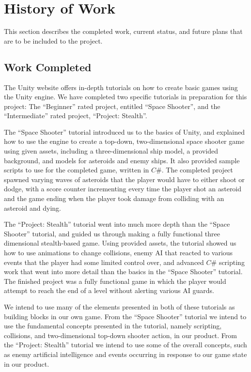 \documentclass[12pt]{article}       %
\def\hs{\hspace{15pt}}
\begin{document}
\section{History of Work}
\label{sec:history}
This section describes the completed work, current status, and future plans that are to be included to the project.

\subsection{Work Completed}

\hs The Unity website offers in-depth tutorials on how to create basic games using the Unity engine. We have completed two specific tutorials in preparation for this project: The “Beginner” rated project, entitled “Space Shooter”, and the “Intermediate” rated project, “Project: Stealth”.

  The “Space Shooter” tutorial introduced us to the basics of Unity, and explained how to use the engine to create a top-down, two-dimensional space shooter game using given assets, including a three-dimensional ship model, a provided background, and models for asteroids and enemy ships. It also provided sample scripts to use for the completed game, written in $C\#$. The completed project spawned varying waves of asteroids that the player would have to either shoot or dodge, with a score counter incrementing every time the player shot an asteroid and the game ending when the player took damage from colliding with an asteroid and dying.

 The “Project: Stealth” tutorial went into much more depth than the “Space Shooter” tutorial, and guided us through making a fully functional three dimensional stealth-based game. Using provided assets, the tutorial showed us how to use animations to change collisions, enemy AI that reacted to various events that the player had some limited control over, and advanced $C\#$ scripting work that went into more detail than the basics in the “Space Shooter” tutorial. The finished project was a fully functional game in which the player would attempt to reach the end of a level without alerting various AI guards.

  We intend to use many of the elements presented in both of these tutorials as building blocks in our own game. From the “Space Shooter” tutorial we intend to use the fundamental concepts presented in the tutorial, namely scripting, collisions, and two-dimensional top-down shooter action, in our product. From the “Project: Stealth” tutorial we intend to use some of the overall concepts, such as enemy artificial intelligence and events occurring in response to our game state in our product.
\end{document}
